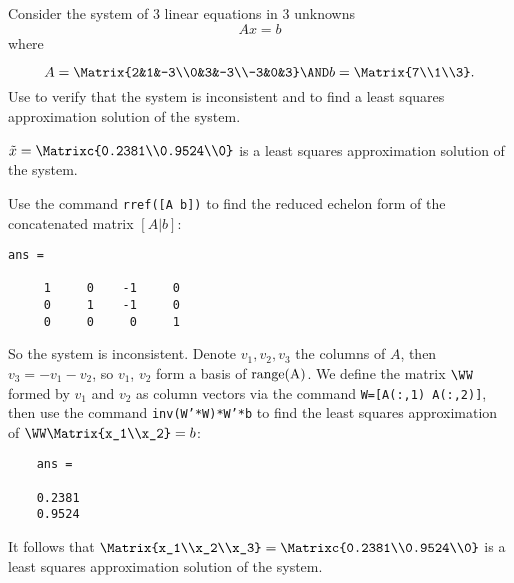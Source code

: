 \begin{computerExercise}  \label{YZ_9.1.16}
Consider the system of 3 linear equations in 3 unknowns
\[
Ax=b
\]
where 

\[
A=\Matrix{2&1&-3\\0&3&-3\\-3&0&3} \AND b=\Matrix{7\\1\\3}.
\]
Use \Matlab to verify that the system is inconsistent and to find a least squares approximation solution of the system.
\begin{solution}

\ans  $\tilde{x}=\Matrixc{0.2381\\0.9524\\0}$ is a least squares approximation solution of the system.

\soln Use the command {\tt rref([A b])} to find the reduced echelon form of the concatenated matrix $[A|b]$:
\begin{verbatim}
ans =

     1     0    -1     0
     0     1    -1     0
     0     0     0     1
\end{verbatim}
So the system is inconsistent.
Denote $v_1,v_2,v_3$ the columns of $A$, then $v_3=-v_1-v_2$, so $v_1$, $v_2$ form a basis of $\textup{range(A)}$. We define the matrix $\WW$ formed by $v_1$ and $v_2$ as column vectors via the command {\tt W=[A(:,1) A(:,2)]}, then use the command {\tt inv(W'*W)*W'*b} to find the least squares approximation of 
$\WW\Matrix{x_1\\x_2}=b$:

\begin{verbatim}
    ans =

    0.2381
    0.9524
\end{verbatim}
It follows that $\Matrix{x_1\\x_2\\x_3}=\Matrixc{0.2381\\0.9524\\0}$ is a least squares approximation solution of the system.

\end{solution}
\end{computerExercise}